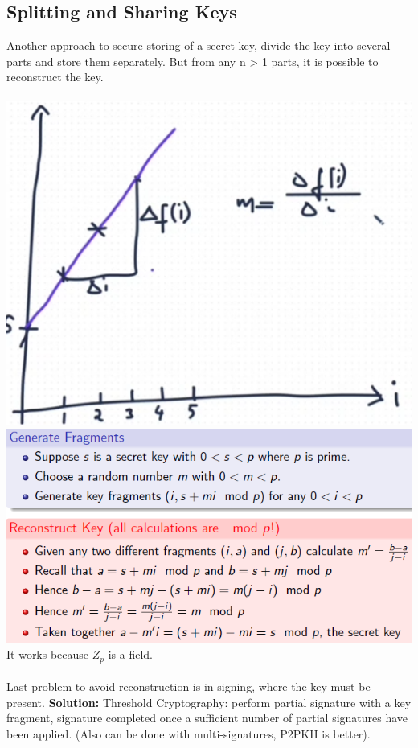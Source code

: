 \documentclass{article}
\begin{document}
\subsection{Splitting and Sharing Keys}
Another approach to secure storing of a secret key, divide the key into several parts and store them separately. But from any n > 1 parts, it is possible to reconstruct the key.\\\\
\includegraphics[scale=0.6]{39.png}
\includegraphics[scale=0.6]{40.png}\\
It works because $Z_p$ is a field.\\\\
Last problem to avoid reconstruction is in signing, where the key must be present. 
\textbf{Solution: }Threshold Cryptography: perform partial signature with a key fragment, signature completed once a sufficient number of partial signatures have been applied. (Also can be done with multi-signatures, P2PKH is better).\\
\end{document}

